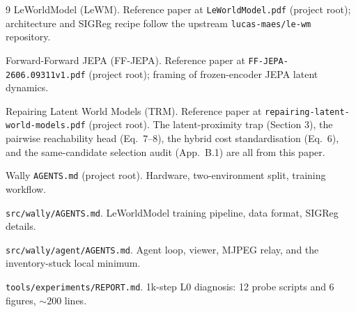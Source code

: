 \documentclass[11pt]{article}
\begin{document}
\begin{thebibliography}{9}
 LeWorldModel (LeWM). Reference paper at
\texttt{LeWorldModel.pdf} (project root); architecture and
SIGReg recipe follow the upstream
\texttt{lucas-maes/le-wm} repository.

 Forward-Forward JEPA (FF-JEPA). Reference paper
at \texttt{FF-JEPA-2606.09311v1.pdf} (project root); framing of
frozen-encoder JEPA latent dynamics.

 Repairing Latent World Models (TRM). Reference
paper at \texttt{repairing-latent-world-models.pdf} (project
root). The latent-proximity trap (Section 3), the pairwise
reachability head (Eq.~7--8), the hybrid cost standardisation
(Eq.~6), and the same-candidate selection audit
(App.~B.1) are all from this paper.

 Wally \texttt{AGENTS.md} (project root).
Hardware, two-environment split, training workflow.

 \texttt{src/wally/AGENTS.md}. LeWorldModel
training pipeline, data format, SIGReg details.

 \texttt{src/wally/agent/AGENTS.md}. Agent
loop, viewer, MJPEG relay, and the inventory-stuck local
minimum.

 \texttt{tools/experiments/REPORT.md}.
1k-step L0 diagnosis: 12 probe scripts and 6 figures,
$\sim 200$ lines.
\end{thebibliography}
\end{document}
